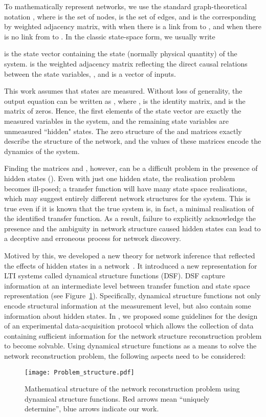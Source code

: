\documentclass[twocolumn,12pt]{autart}
\theoremstyle{plain}
\begin{document}
To mathematically represent networks, we use the standard graph-theoretical notation , where  is the set of nodes,  is the set of edges, and  is the corresponding  by  weighted adjacency matrix, with  when there is a link from  to , and  when there is no link from  to . 
In the classic state-space form, we usually write

 is the state vector containing the state (normally physical quantity) of the system.  is the weighted adjacency matrix reflecting the direct causal relations between the state variables, , and  is a vector of  inputs.  

This work assumes that  states are measured. Without loss of generality, the output equation can be written as , where ,  is the  identity matrix, and  is the  matrix of zeros.  Hence, the first  elements of the state vector  are exactly the measured variables in the system, and the remaining  state variables are unmeasured ``hidden" states. The zero structure of the  and  matrices exactly describe the structure of the network, and the values of these matrices encode the dynamics of the system.


Finding the matrices  and , however, can be a difficult problem in the presence of hidden states (). Even with just one hidden state, the realisation problem becomes ill-posed; a transfer function will have many state space realisations, which may suggest entirely different network structures for the system.  This is true even if it is known that the true system is, in fact, a minimal realisation of the identified transfer function.  As a result, failure to explicitly acknowledge the presence and the ambiguity in network structure caused hidden states can lead to a deceptive and erroneous process for network discovery.



Motived by this, we developed a new theory for network inference that reflected the effects of hidden states in a network~\cite{08net_rec}. It introduced a new representation for LTI systems called dynamical structure functions (DSF). DSF capture information at an intermediate level between transfer function and state space
representation (see Figure~\ref{Fig:math}). Specifically, dynamical structure functions not only encode structural information at the measurement level, but also contain some
information about hidden states. In \cite{08net_rec}, we proposed some guidelines for the design of an experimental data-acquisition protocol which allows the collection of data containing sufficient information for the network structure reconstruction problem
to become solvable. Using dynamical structure functions as a means to solve the network reconstruction problem, the following aspects need to be considered:
\begin{figure}
\centering
\texttt{[image: Problem\_structure.pdf]}
\caption{Mathematical structure of the network reconstruction problem using dynamical structure functions. Red arrows mean ``uniquely determine'', blue arrows indicate our work.}\label{Fig:math}
\end{figure}
\end{document}
